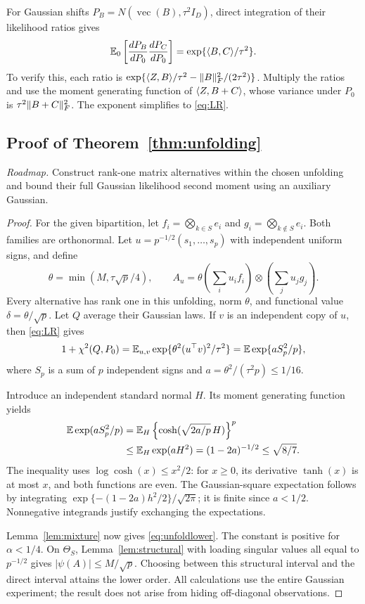 For Gaussian shifts $P_B=N(\operatorname{vec}(B),\tau^2I_D)$, direct integration of their likelihood ratios gives
\begin{equation}\label{eq:LR}
 \mathbb E_0\left[\frac{dP_B}{dP_0}\frac{dP_C}{dP_0}\right]
 =\exp\{\langle B,C\rangle/\tau^2\}.
\end{equation}
To verify this, each ratio is $\exp\{\langle Z,B\rangle/\tau^2-\lVert B\rVert_F^2/(2\tau^2)\}$. Multiply the ratios and use the moment generating function of $\langle Z,B+C\rangle$, whose variance under $P_0$ is $\tau^2\lVert B+C\rVert_F^2$. The exponent simplifies to \eqref{eq:LR}.

\subsection{Proof of Theorem~\ref{thm:unfolding}}


\noindent\emph{Roadmap.} Construct rank-one matrix alternatives within the chosen unfolding and bound their full Gaussian likelihood second moment using an auxiliary Gaussian.
\begin{proof}
For the given bipartition, let $f_i=\bigotimes_{k\in S}e_i$ and $g_i=\bigotimes_{k\notin S}e_i$. Both families are orthonormal. Let $u=p^{-1/2}(s_1,\ldots,s_p)$ with independent uniform signs, and define
\[
 \theta=\min(M,\tau\sqrt p/4),\qquad
 A_u=\theta\left(\sum_i u_i f_i\right)\otimes
                    \left(\sum_j u_j g_j\right).
\]
Every alternative has rank one in this unfolding, norm $\theta$, and functional value $\delta=\theta/\sqrt p$. Let $Q$ average their Gaussian laws. If $v$ is an independent copy of $u$, then \eqref{eq:LR} gives
\[
 1+\chi^2(Q,P_0)=\mathbb E_{u,v}\exp\{\theta^2(u^\top v)^2/\tau^2\}
 =\mathbb E\exp\{a S_p^2/p\},
\]
where $S_p$ is a sum of $p$ independent signs and $a=\theta^2/(\tau^2p)\le1/16$.

Introduce an independent standard normal $H$. Its moment generating function yields
\begin{align*}
 \mathbb E\exp(aS_p^2/p)
 &=\mathbb E_H\left\{\cosh(\sqrt{2a/p}\,H)\right\}^p\\
 &\le\mathbb E_H\exp(aH^2)=(1-2a)^{-1/2}\le\sqrt{8/7}.
\end{align*}
The inequality uses $\log\cosh(x)\le x^2/2$: for $x\ge0$, its derivative $\tanh(x)$ is at most $x$, and both functions are even. The Gaussian-square expectation follows by integrating $\exp\{-(1-2a)h^2/2\}/\sqrt{2\pi}$; it is finite since $a<1/2$. Nonnegative integrands justify exchanging the expectations.

Lemma~\ref{lem:mixture} now gives \eqref{eq:unfoldlower}. The constant is positive for $\alpha<1/4$. On $\Theta_S$, Lemma~\ref{lem:structural} with loading singular values all equal to $p^{-1/2}$ gives $|\psi(A)|\le M/\sqrt p$. Choosing between this structural interval and the direct interval attains the lower order. All calculations use the entire Gaussian experiment; the result does not arise from hiding off-diagonal observations.
\end{proof}

